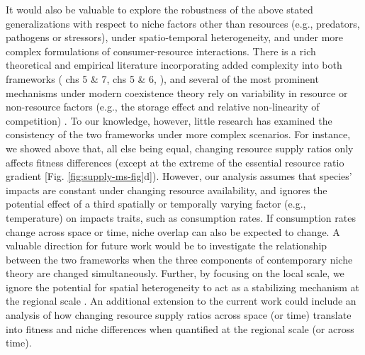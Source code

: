 It would also be valuable to explore the robustness of the above stated generalizations with respect to niche factors other than resources (e.g., predators, pathogens or stressors), under spatio-temporal heterogeneity, and under more complex formulations of consumer-resource interactions. There is a rich theoretical and empirical literature incorporating added complexity into both frameworks (\citealp{Grover1997} chs 5 \& 7, \citealp{Chase2003} chs 5 \& 6,  \citealp{Chesson2008b, Chesson2013ecosys}), and several of the most prominent mechanisms under modern coexistence theory rely on variability in resource or non-resource factors (e.g., the storage effect and relative non-linearity of competition) \citep{Chesson1994, Chesson2000c, Chesson2000}. To our knowledge, however, little research has examined the consistency of the two frameworks under more complex scenarios. For instance, we showed above that, all else being equal, changing resource supply ratios only affects fitness differences (except at the extreme of the essential resource ratio gradient [Fig. \ref{fig:supply-ms-fig}d]). However, our analysis assumes that species' impacts are constant under changing resource availability, and ignores the potential effect of a third spatially or temporally varying factor (e.g., temperature) on impacts traits, such as consumption rates. If consumption rates change across space or time, niche overlap can also be expected to change. A valuable direction for future work would be to investigate the relationship between the two frameworks when the three components of contemporary niche theory are changed simultaneously. Further, by focusing on the local scale, we ignore the potential for spatial heterogeneity to act as a stabilizing mechanism at the regional scale \citep{Adler2006, Sears2007, Angert2009}. An additional extension to the current work could include an analysis of how changing resource supply ratios across space (or time) translate into fitness and niche differences when quantified at the regional scale (or across time).
\par


